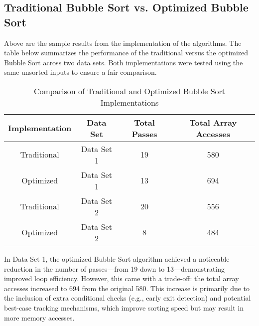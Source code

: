 \subsection{Traditional Bubble Sort vs. Optimized Bubble Sort}


Above are the sample results from the implementation of the algorithms. The table below summarizes the performance of the traditional versus the optimized Bubble Sort across two data sets. Both implementations were tested using the same unsorted inputs to ensure a fair comparison.

\begin{table}[h]
    \centering
    \caption{Comparison of Traditional and Optimized Bubble Sort Implementations}
    \begin{tabular}{|c|c|c|c|}
        \hline
        \textbf{Implementation} & \textbf{Data Set} & \textbf{Total Passes} & \textbf{Total Array Accesses} \\
        \hline
        Traditional & Data Set 1 & 19 & 580 \\
        Optimized   & Data Set 1 & 13 & 694 \\
        \hline
        Traditional & Data Set 2 & 20 & 556 \\
        Optimized   & Data Set 2 & 8  & 484 \\
        \hline
    \end{tabular}
    \label{tab:sort_comparison}
\end{table}

In Data Set 1, the optimized Bubble Sort algorithm achieved a noticeable reduction in the number of passes—from 19 down to 13—demonstrating improved loop efficiency. However, this came with a trade-off: the total array accesses increased to 694 from the original 580. This increase is primarily due to the inclusion of extra conditional checks (e.g., early exit detection) and potential best-case tracking mechanisms, which improve sorting speed but may result in more memory accesses.

